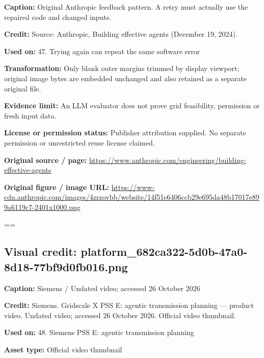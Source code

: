 \documentclass[10pt,letterpaper]{article}
\begin{document}
\textbf{Caption:} Original Anthropic feedback pattern. A retry must actually use the repaired code and changed inputs.\par
\textbf{Credit:} Source: Anthropic, Building effective agents (December 19, 2024).\par
\textbf{Used on:} 47. Trying again can repeat the same software error\par
\textbf{Transformation:} Only blank outer margins trimmed by display viewport; original image bytes are embedded unchanged and also retained as a separate original file.\par
\textbf{Evidence limit:} An LLM evaluator does not prove grid feasibility, permission or fresh input data.\par
\textbf{License or permission status:} Publisher attribution supplied. No separate permission or unrestricted reuse license claimed.\par
\textbf{Original source / page:} \href{https://www.anthropic.com/engineering/building-effective-agents}{\small\ttfamily https:/\allowbreak{}/\allowbreak{}www.\allowbreak{}anthropic.\allowbreak{}com/\allowbreak{}engineering/\allowbreak{}building-\allowbreak{}effective-\allowbreak{}agents}\par
\textbf{Original figure / image URL:} \href{https://www-cdn.anthropic.com/images/4zrzovbb/website/14f51e6406ccb29e695da48b17017e899a6119c7-2401x1000.png}{\small\ttfamily https:/\allowbreak{}/\allowbreak{}www-\allowbreak{}cdn.\allowbreak{}anthropic.\allowbreak{}com/\allowbreak{}images/\allowbreak{}4zrzovbb/\allowbreak{}website/\allowbreak{}14f51e6406ccb29e695da48b17017e899a6119c7-\allowbreak{}2401x1000.\allowbreak{}png}\par
\egroup\par\noindent\box\readingEntry\par\medskip
\setbox\readingEntry=\vbox\bgroup\hsize=\linewidth\subsection*{Visual credit: platform\_682ca322-5d0b-47a0-8d18-77bf9d0fb016.png}
\textbf{Caption:} Siemens / Undated video; accessed 26 October 2026\par
\textbf{Credit:} Siemens. Gridscale X PSS E: agentic transmission planning --- product video. Undated video; accessed 26 October 2026. Official video thumbnail.\par
\textbf{Used on:} 48. Siemens PSS E: agentic transmission planning\par
\textbf{Asset type:} Official video thumbnail\par
\end{document}
